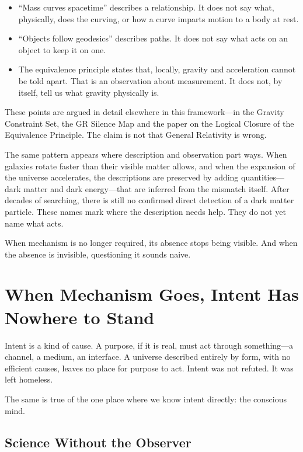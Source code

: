 \documentclass[11pt,a4paper]{article}
\begin{document}
\begin{itemize}
  \item ``Mass curves spacetime'' describes a relationship. It does not say what, physically, does the curving, or how a curve imparts motion to a body at rest.
  \item ``Objects follow geodesics'' describes paths. It does not say what acts on an object to keep it on one.
  \item The equivalence principle states that, locally, gravity and acceleration cannot be told apart. That is an observation about measurement. It does not, by itself, tell us what gravity physically is.
\end{itemize}

These points are argued in detail elsewhere in this framework---in the Gravity Constraint Set, the GR Silence Map and the paper on the Logical Closure of the Equivalence Principle. The claim is not that General Relativity is wrong. 

The same pattern appears where description and observation part ways. When galaxies rotate faster than their visible matter allows, and when the expansion of the universe accelerates, the descriptions are preserved by adding quantities---dark matter and dark energy---that are inferred from the mismatch itself. After decades of searching, there is still no confirmed direct detection of a dark matter particle. These names mark where the description needs help. They do not yet name what acts.

When mechanism is no longer required, its absence stops being visible. And when the absence is invisible, questioning it sounds naive.

\section{When Mechanism Goes, Intent Has Nowhere to Stand}

Intent is a kind of cause. A purpose, if it is real, must act through something---a channel, a medium, an interface. A universe described entirely by form, with no efficient causes, leaves no place for purpose to act. Intent was not refuted. It was left homeless.

The same is true of the one place where we know intent directly: the conscious mind.

\subsection{Science Without the Observer}
\end{document}
